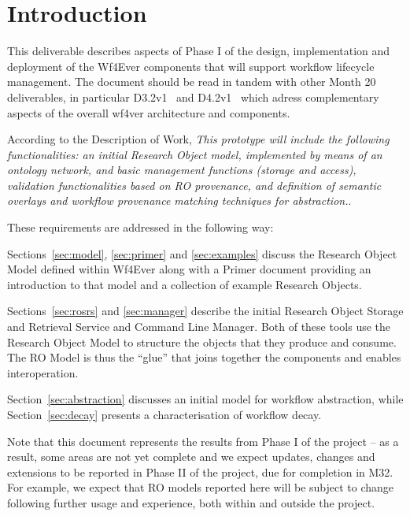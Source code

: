 \section{Introduction}

This deliverable describes aspects of Phase I of the design,
implementation and deployment of the Wf4Ever components that will
support workflow lifecycle management. The document should be read in
tandem with other Month 20 deliverables, in particular
D3.2v1~\cite{D3.2v1} and D4.2v1~\cite{D4.2v1} which adress
complementary aspects of the overall wf4ver architecture and
components.

According to the Description of Work, \emph{This prototype will
  include the following functionalities: an initial Research Object
  model, implemented by means of an ontology network, and basic
  management functions (storage and access), validation
  functionalities based on RO provenance, and definition of semantic
  overlays and workflow provenance matching techniques for
  abstraction.}. 

These requirements are addressed in the following way:

Sections~\ref{sec:model}, \ref{sec:primer} and \ref{sec:examples}
discuss the Research Object Model defined within Wf4Ever along with a
Primer document providing an introduction to that model and a
collection of example Research Objects. 

Sections~\ref{sec:rosrs} and \ref{sec:manager} describe the initial
Research Object Storage and Retrieval Service and Command Line
Manager. Both of these tools use the Research Object Model to
structure the objects that they produce and consume. The RO Model is
thus the ``glue'' that joins together the components and enables
interoperation. 

Section~\ref{sec:abstraction} discusses an initial model for workflow
abstraction, while Section~\ref{sec:decay} presents a characterisation
of workflow decay. 

Note that this document represents the results from Phase I of the
project -- as a result, some areas are not yet complete and we expect
updates, changes and extensions to be reported in Phase II of the
project, due for completion in M32. For example, we expect that RO models reported
here will be subject to change following further usage and experience,
both within and outside the project.